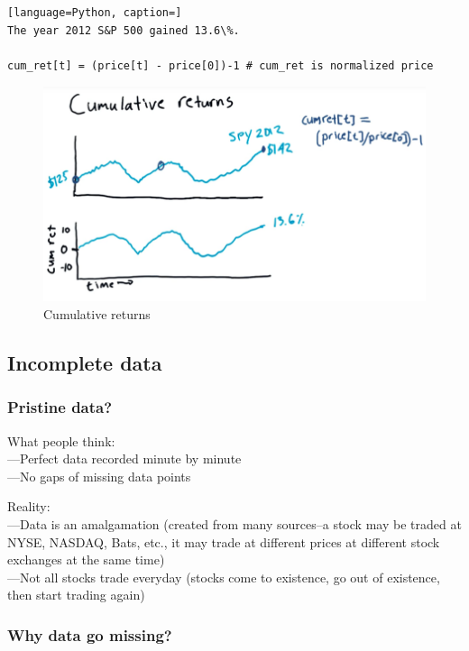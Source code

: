 \documentclass[12pt]{article}
\begin{document}
\begin{lstlisting}[language=Python, caption=]
The year 2012 S&P 500 gained 13.6\%.

cum_ret[t] = (price[t] - price[0])-1 # cum_ret is normalized price
\end{lstlisting}

\begin{figure}[!ht]
\centering
\includegraphics[scale=0.45]{fig/fig13}
\caption{Cumulative returns}
\end{figure}

\subsection{Incomplete data}

\subsubsection{Pristine data?} 
\noindent
What people think: \\
---Perfect data recorded minute by minute \\
---No gaps of missing data points

\noindent
Reality: \\
---Data is an amalgamation (created from many sources--a stock may be traded at NYSE, NASDAQ, Bats, etc., it may trade at different prices at different stock exchanges at the same time)\\
---Not all stocks trade everyday (stocks come to existence, go out of existence, then start trading again) 

\subsubsection{Why data go missing?} 
\end{document}
